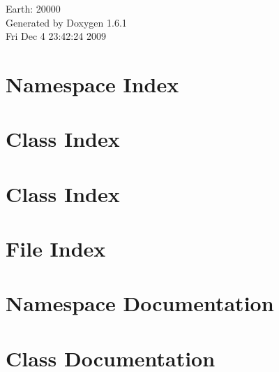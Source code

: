 \documentclass[a4paper]{book}
\begin{document}
\hypersetup{pageanchor=false}
\begin{titlepage}
\vspace*{7cm}
\begin{center}
{\Large Earth: 20000 }\\
\vspace*{1cm}
{\large Generated by Doxygen 1.6.1}\\
\vspace*{0.5cm}
{\small Fri Dec 4 23:42:24 2009}\\
\end{center}
\end{titlepage}
\clearemptydoublepage
{}
\tableofcontents
\clearemptydoublepage
{}
\hypersetup{pageanchor=true}
\chapter{Namespace Index}

\chapter{Class Index}

\chapter{Class Index}

\chapter{File Index}

\chapter{Namespace Documentation}

\chapter{Class Documentation}









































\end{document}

